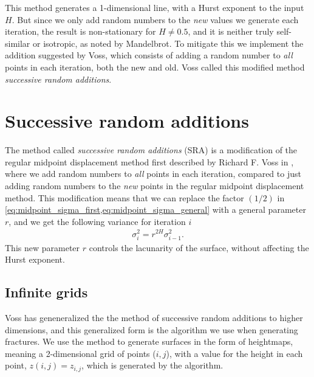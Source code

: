 This method generates a 1-dimensional line, with a Hurst exponent to the input $H$. But since we only add random numbers to the \emph{new} values we generate each iteration, the result is non-stationary for $H \neq 0.5$\cite{voss1985random}, and it is neither truly self-similar or isotropic, as noted by Mandelbrot\cite{mandelbrot1982comment}. To mitigate this we implement the addition suggested by Voss\cite{voss1985random}, which consists of adding a random number to \emph{all} points in each iteration, both the new and old. Voss called this modified method \emph{successive random additions}. %

\section{Successive random additions}
The method called \emph{successive random additions} (SRA) is a modification of the regular midpoint displacement method first described by Richard F. Voss in \cite{voss1985random}, where we add random numbers to \emph{all} points in each iteration, compared to just adding random numbers to the \emph{new} points in the regular midpoint displacement method. This modification means that we can replace the factor $(1/2)$ in \cref{eq:midpoint_sigma_first,eq:midpoint_sigma_general} with a general parameter $r$,%
and we get the following variance for iteration $i$
\begin{align*}
    \sigma_i^2 = r^{2H}\sigma^2_{i-1}.
\end{align*}
This new parameter $r$ controls the lacunarity of the surface, without affecting the Hurst exponent.%

\subsection{Infinite grids}
Voss has geneneralized the the method of successive random additions to higher dimensions\cite{voss1985random}, and this generalized form is the algorithm we use when generating fractures. We use the method to generate surfaces in the form of heightmaps, meaning a 2-dimensional grid of points ({$i,j$}), with a value for the height in each point, $z(i,j) = z_{i,j}$, which is generated by the algorithm.

